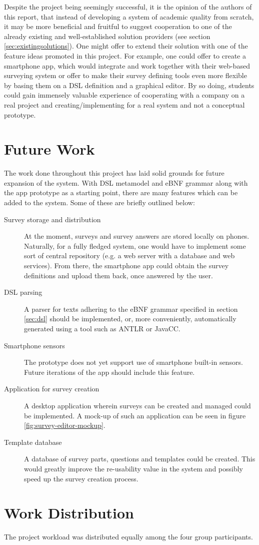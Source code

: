 Despite the project being seemingly successful, it is the opinion of the authors of this report, that instead of developing a system of academic quality from scratch, it may be more beneficial and fruitful to suggest cooperation to one of the already existing and well-established solution providers (see section \ref{sec:existingsolutions}). One might offer to extend their solution with one of the feature ideas promoted in this project. For example, one could offer to create a smartphone app, which would integrate and work together with their web-based surveying system or offer to make their survey defining tools even more flexible by basing them on a DSL definition and a graphical editor.
By so doing, students could gain immensely valuable experience of cooperating with a company on a real project and creating/implementing for a real system and not a conceptual prototype.

\section{Future Work}
\label{sec:futurework}
The work done throughout this project has laid solid grounds for future expansion of the system. With DSL metamodel and eBNF grammar along with the app prototype as a starting point, there are many features which can be added to the system. Some of these are briefly outlined below:
\begin{description}
\item[Survey storage and distribution] At the moment, surveys and survey answers are stored locally on phones. Naturally, for a fully fledged system, one would have to implement some sort of central repository (e.g. a web server with a database and web services). From there, the smartphone app could obtain the survey definitions and upload them back, once answered by the user.
\item[DSL parsing] A parser for texts adhering to the eBNF grammar specified in section \ref{sec:dsl} should be implemented, or, more conveniently, automatically generated using a tool such as ANTLR or JavaCC.
\item[Smartphone sensors] The prototype does not yet support use of smartphone built-in sensors. Future iterations of the app should include this feature.
\item[Application for survey creation] A desktop application wherein surveys can be created and managed could be implemented. A mock-up of such an application can be seen in figure \ref{fig:survey-editor-mockup}.
\item[Template database] A database of survey parts, questions and templates could be created. This would greatly improve the re-usability value in the system and possibly speed up the survey creation process.
\end{description}

\section{Work Distribution}
\label{sec:workdistribution}
The project workload was distributed equally among the four group participants.